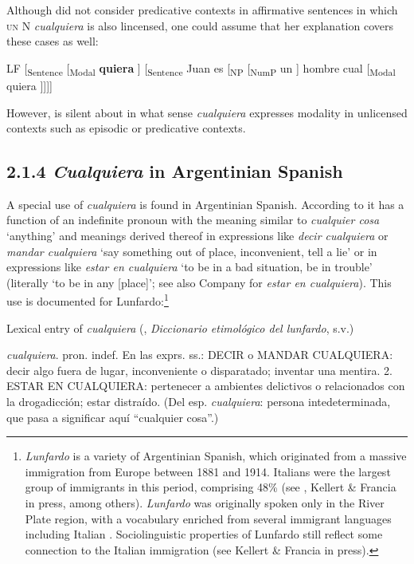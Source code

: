 Although \citet{Rivero2011} did not consider predicative contexts in affirmative sentences in which \textsc{un} N \textit{cualquiera} is also lincensed, one could assume that her explanation covers these cases as well:

  LF [\textsubscript{Sentence} [\textsubscript{Modal} \textbf{quiera} ] [\textsubscript{Sentence} Juan es [\textsubscript{NP} [\textsubscript{NumP} un ] hombre cual [\textsubscript{Modal} quiera ]]]]

However, \citet{Rivero2011} is silent about in what sense \textit{cualquiera} expresses modality in unlicensed contexts such as episodic or predicative contexts.

\subsection{\textbf{2.1.4} \textbf{\textit{Cualquiera}} \textbf{in} \textbf{Argentinian} \textbf{Spanish}}

A special use of \textit{cualquiera} is found in Argentinian Spanish. According to \citet{Conde2011} it has a function of an indefinite pronoun with the meaning similar to \textit{cualquier cosa} ‘anything’ and meanings derived thereof in expressions like \textit{decir cualquiera} or \textit{mandar cualquiera} ‘say something out of place, inconvenient, tell a lie’ or in expressions like \textit{estar en cualquiera} ‘to be in a bad situation, be in trouble’ (literally ‘to be in any [place]’; see also Company \citealt{Company2009} for \textit{estar en cualquiera}). This use is documented for Lunfardo:\footnote{{\textit{Lunfardo}} {is a variety of Argentinian Spanish, which originated from a massive immigration from Europe between 1881 and 1914. Italians were the largest group of immigrants in this period, comprising 48\% (see \citealt{Devoto2002}, Kellert \& Francia in press, among others).} {\textit{Lunfardo}} {was originally spoken only in the River Plate region, with a vocabulary enriched from several immigrant languages including Italian \citep{Conde2011}. Sociolinguistic properties of Lunfardo still reflect some connection to the Italian immigration (see Kellert \& Francia in press).}}

  Lexical entry of \textit{cualquiera} (\citealt{Conde2011}, \textit{Diccionario etimológico del lunfardo}, s.v.)

  \textit{cualquiera}. pron. indef. En las exprs. ss.: DECIR o MANDAR CUALQUIERA: decir algo fuera de lugar, inconveniente o disparatado; inventar una mentira. {\textbar} 2. ESTAR EN CUALQUIERA: pertenecer a ambientes delictivos o relacionados con la drogadicción; estar distraído. (Del esp. \textit{cualquiera}: persona intedeterminada, que pasa a significar aquí “cualquier cosa”.) 

